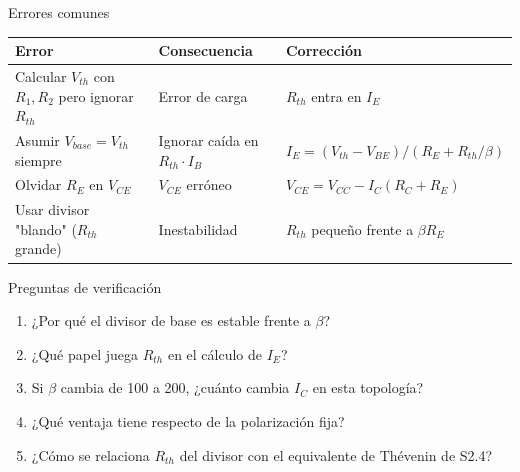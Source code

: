 \documentclass[aspectratio=169]{beamer}
\begin{document}
\begin{frame}{Errores comunes}
  \begin{table}
    \small
    \begin{tabular}{p{}p{}p{}}
      \toprule
      Error & Consecuencia & Corrección \\
      \midrule
      Calcular $V_{th}$ con $R_1,R_2$ pero ignorar $R_{th}$ & Error de carga & $R_{th}$ entra en $I_E$ \\
      Asumir $V_{base} = V_{th}$ siempre & Ignorar caída en $R_{th}\cdot I_B$ & $I_E = (V_{th}-V_{BE})/(R_E+R_{th}/\beta)$ \\
      Olvidar $R_E$ en $V_{CE}$ & $V_{CE}$ erróneo & $V_{CE} = V_{CC}-I_C(R_C+R_E)$ \\
      Usar divisor "blando" ($R_{th}$ grande) & Inestabilidad & $R_{th}$ pequeño frente a $\beta R_E$ \\
      \bottomrule
    \end{tabular}
  \end{table}
\end{frame}

\begin{frame}{Preguntas de verificación}
  \begin{enumerate}
    \item ¿Por qué el divisor de base es estable frente a $\beta$?
    \item ¿Qué papel juega $R_{th}$ en el cálculo de $I_E$?
    \item Si $\beta$ cambia de 100 a 200, ¿cuánto cambia $I_C$ en esta topología?
    \item ¿Qué ventaja tiene respecto de la polarización fija?
    \item ¿Cómo se relaciona $R_{th}$ del divisor con el equivalente de Thévenin de S2.4?
  \end{enumerate}
\end{frame}
\end{document}
